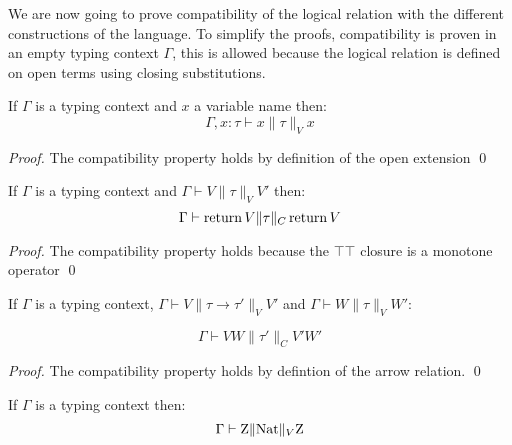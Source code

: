 We are now going to prove compatibility of the logical relation with 
the different constructions of the language. To simplify the proofs, 
compatibility is proven in an empty typing context $\Gamma$, this is allowed 
because the logical relation is defined on open terms using closing 
substitutions.

\begin{alemma}
    If $\Gamma$ is a typing context and $x$ a variable name then:
    \begin{equation*}
        \Gamma, x:\tau \vdash x \| \tau \|_V x 
    \end{equation*}
\end{alemma}

\begin{proof}
    The compatibility property holds by definition of the open extension
\qed\end{proof}

\begin{alemma}
    If $\Gamma$ is a typing context and $\Gamma \vdash V \| \tau \|_V V'$ then:
    \begin{equation*}
        \Gamma \vdash \operatorname{return} V \| \tau \|_C \operatorname{return} V
    \end{equation*}
\end{alemma}

\begin{proof}
    The compatibility property holds because the $\top\top$ closure 
    is a monotone operator
\qed\end{proof}

\begin{alemma}
    If $\Gamma$ is a typing context,
    $\Gamma \vdash V \| \tau \to \tau' \|_V V'$ 
    and $\Gamma \vdash W \| \tau \|_V W'$:

    \begin{equation*}
        \Gamma \vdash VW \| \tau' \|_C V'W'
    \end{equation*}
\end{alemma}

\begin{proof}
    The compatibility property holds by defintion of the arrow relation.
\qed\end{proof}

\begin{alemma}
    If $\Gamma$ is a typing context then:
    \begin{equation*}
        \Gamma \vdash \textnormal{Z} \| \textnormal{Nat} \|_V \textnormal{Z} 
    \end{equation*}
\end{alemma}

